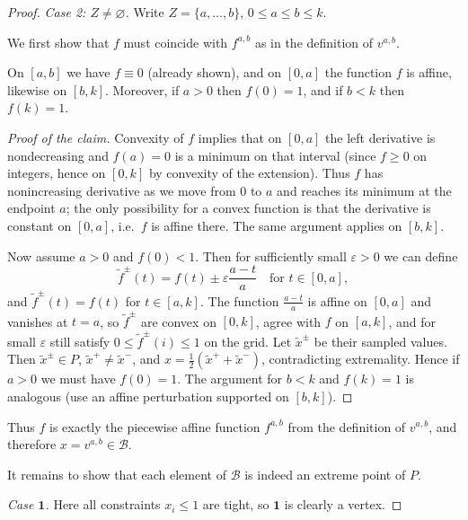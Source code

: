 \begin{proof}
    \smallskip
    \emph{Case 2: $Z\neq\varnothing$.}
    Write $Z=\{a,\dots,b\}$, $0\le a\le b\le k$.

    We first show that $f$ must coincide with $f^{a,b}$ as in the definition of $v^{a,b}$.

    \begin{claim}
        On $[a,b]$ we have $f\equiv0$ (already shown), and on $[0,a]$ the function $f$ is affine, likewise on $[b,k]$.
        Moreover, if $a>0$ then $f(0)=1$, and if $b<k$ then $f(k)=1$.
    \end{claim}

    \begin{proof}[Proof of the claim]
        Convexity of $f$ implies that on $[0,a]$ the left derivative is nondecreasing and $f(a)=0$ is a minimum on that interval (since $f\ge0$ on integers, hence on $[0,k]$ by convexity of the extension).
        Thus $f$ has nonincreasing derivative as we move from $0$ to $a$ and reaches its minimum at the endpoint $a$; the only possibility for a convex function is that the derivative is constant on $[0,a]$, i.e.\ $f$ is affine there.
        The same argument applies on $[b,k]$.

        Now assume $a>0$ and $f(0)<1$.
        Then for sufficiently small $\varepsilon>0$ we can define
        \[
            \tilde f^{\pm}(t)=f(t)\pm\varepsilon\frac{a-t}{a}\quad\text{for }t\in[0,a],
        \]
        and $\tilde f^{\pm}(t)=f(t)$ for $t\in[a,k]$.
        The function $\frac{a-t}{a}$ is affine on $[0,a]$ and vanishes at $t=a$, so $\tilde f^{\pm}$ are convex on $[0,k]$, agree with $f$ on $[a,k]$, and for small $\varepsilon$ still satisfy $0\le \tilde f^{\pm}(i)\le1$ on the grid.
        Let $\tilde x^{\pm}$ be their sampled values.
        Then $\tilde x^{\pm}\in P$, $\tilde x^{+}\neq \tilde x^{-}$, and $x=\frac12(\tilde x^{+}+\tilde x^{-})$, contradicting extremality.
        Hence if $a>0$ we must have $f(0)=1$.
        The argument for $b<k$ and $f(k)=1$ is analogous (use an affine perturbation supported on $[b,k]$).
    \end{proof}

    Thus $f$ is exactly the piecewise affine function $f^{a,b}$ from the definition of $v^{a,b}$, and therefore $x=v^{a,b}\in\mathcal{B}$.

    \medskip
    It remains to show that each element of $\mathcal{B}$ is indeed an extreme point of $P$.

    \smallskip
    \emph{Case $\mathbf{1}$.}
    Here all constraints $x_i\le1$ are tight, so $\mathbf{1}$ is clearly a vertex.


\end{proof}
